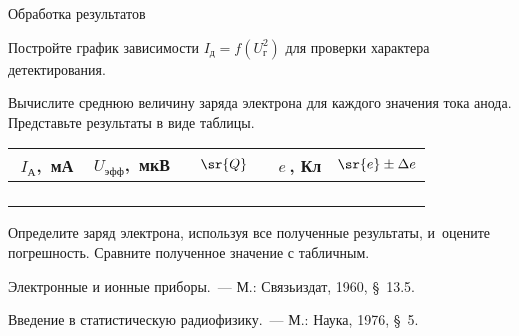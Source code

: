 \etp

\zn Обработка результатов

\n Постройте график зависимости $I_д=f(U^2_г)$ для проверки характера детектирования.

\n Вычислите среднюю величину заряда электрона для каждого значения тока анода. Представьте результаты в виде таблицы.

\begin{center}
\begin{tabular}{|c|c|c|c|c|}
\hline $\;I_А$,~мА&$\;U_{эфф}$,~мкВ&$\quad\sr{Q}\quad$&$e~$, Кл&$\sr{e}\pm\Delta e$\\\hline\hline
 & & & &\\
 & & & &\\
 & & & &\\
 & & & &\\
\hline
\end{tabular}
\end{center}

\n Определите заряд электрона, используя все полученные результаты, и~оцените погрешность. Сравните полученное значение
с табличным.

{\small

\lit

 Электронные и ионные приборы.~--- М.: Связьиздат, 1960, \S~13.5.

 Введение в статистическую радиофизику.~--- М.: Наука, 1976, \S~5.

}
